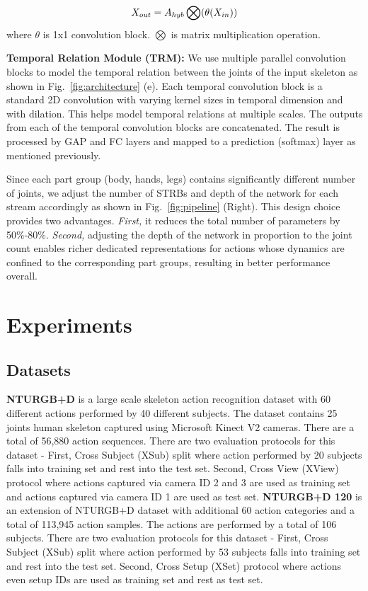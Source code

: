 \documentclass[runningheads]{llncs}
\begin{document}
\begin{equation}
\centering
X_{out} =  A_{hyb} \bigotimes ( \theta (X_{in}))
\end{equation}
where $\theta$ is 1x1 convolution block. $\bigotimes$ is matrix multiplication operation.

\noindent \textbf{Temporal Relation Module (TRM):} We use multiple parallel convolution blocks to model the temporal relation between the joints of the input skeleton as shown in Fig.~\ref{fig:architecture} (e). Each temporal convolution block is a standard 2D convolution with varying kernel sizes in temporal dimension and with dilation. This helps model temporal relations at multiple scales. The outputs from each of the temporal convolution blocks are concatenated. The result is processed by GAP and FC layers and mapped to a prediction (softmax) layer as mentioned previously.  

Since each part group (body, hands, legs) contains significantly different number of joints, we adjust the number of STRBs and depth of the network for each stream accordingly as shown in Fig.~\ref{fig:pipeline} (Right). This design choice provides two advantages. \textit{First,} it reduces the total number of parameters by 50\%-80\%. \textit{Second,} adjusting the depth of the network in proportion to the joint count enables richer dedicated representations for actions whose dynamics are confined to the corresponding part groups, resulting in better performance overall.





\section{Experiments}
\label{sec:experiments}

\subsection{Datasets}
\label{sec:datasets}

\textbf{NTURGB+D\cite{Shahroudy_2016_CVPR}} is a large scale skeleton action recognition dataset with 60 different actions performed by 40 different subjects. The dataset contains 25 joints human skeleton captured using Microsoft Kinect V2 cameras. There are a total of 56,880 action sequences. There are two evaluation protocols for this dataset - First, Cross Subject (XSub) split where action performed by 20 subjects falls into training set and rest into the test set. Second, Cross View (XView) protocol where actions captured via camera ID 2 and 3 are used as training set and actions captured via camera ID 1 are used as test set.
\newline
\textbf{NTURGB+D 120\cite{Liu_2019_NTURGBD120}} is an extension of NTURGB+D dataset with additional 60 action categories and a total of 113,945 action samples. The actions are performed by a total of 106 subjects. There are two evaluation protocols for this dataset - First, Cross Subject (XSub) split where action performed by 53 subjects falls into training set and rest into the test set. Second, Cross Setup (XSet) protocol where actions even setup IDs are used as training set and rest as test set.
\end{document}
